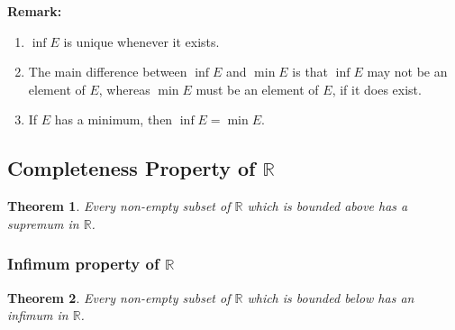 \documentclass[12pt]{article}
\newtheorem{theorem}{Theorem}[section]
\theoremstyle{definition}
\begin{document}
\textbf{Remark:}
\begin{enumerate}[label=(\roman*)]
\item $\inf E$ is unique whenever it exists.
\item The main difference between $\inf E$ and $\min E$ is that $\inf E$ may not be an element of $E$, whereas $\min E$ must be an element of $E$, if it does exist.
\item If $E$ has a minimum, then $\inf E = \min E$.
\end{enumerate}
\subsection{Completeness Property of $\mathbb{R}$}
\begin{theorem}\normalfont Every non-empty subset of $\mathbb{R}$ which is bounded above has a supremum in $\mathbb{R}$.
\end{theorem}
\subsubsection{Infimum property of $\mathbb{R}$}
\begin{theorem}\normalfont Every non-empty subset of $\mathbb{R}$ which is bounded below has an infimum in $\mathbb{R}$.
\end{theorem}
\end{document}
